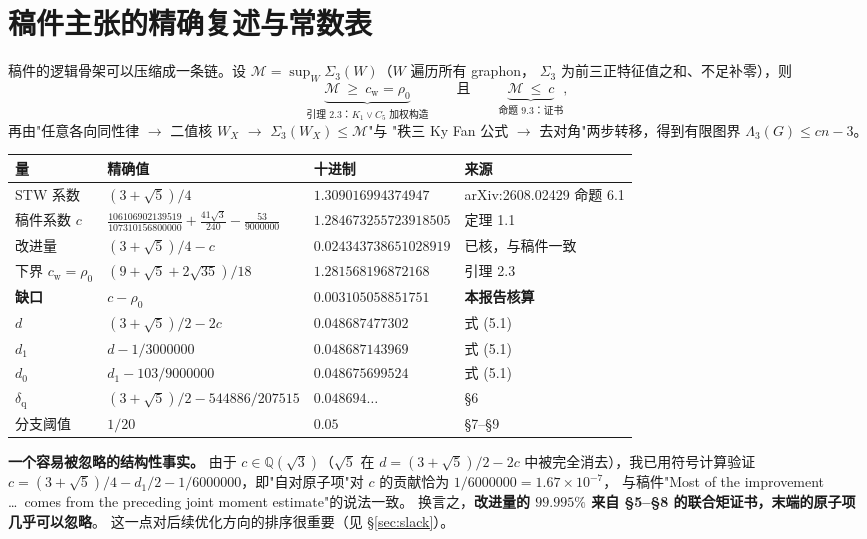 \documentclass[UTF8,11pt]{ctexart}
\theoremstyle{definition}
\newcommand{\Lam}{\Lambda}
\begin{document}
\section{稿件主张的精确复述与常数表}\label{sec:claims}

稿件的逻辑骨架可以压缩成一条链。设 $\mathcal M=\sup_W\Sigma_3(W)$（$W$ 遍历所有 graphon，
$\Sigma_3$ 为前三正特征值之和、不足补零），则
\[
 \underbrace{\mathcal M\ \ge\ c_{\mathrm w}=\rho_0}_{\text{引理 2.3：}K_1\vee C_5\text{ 加权构造}}
 \qquad\text{且}\qquad
 \underbrace{\mathcal M\ \le\ c}_{\text{命题 9.3：证书}},
\]
再由"任意各向同性律 $\to$ 二值核 $W_X$ $\to$ $\Sigma_3(W_X)\le\mathcal M$"与
"秩三 Ky Fan 公式 $\to$ 去对角"两步转移，得到有限图界 $\Lam_3(G)\le cn-3$。

\begin{center}
\small
\begin{tabular}{llll}
\toprule
量 & 精确值 & 十进制 & 来源\\
\midrule
STW 系数 & $(3+\sqrt5)/4$ & $1.309016994374947$ & \cite{STW} arXiv:2608.02429 命题 6.1\\
稿件系数 $c$ & $\frac{106106902139519}{107310156800000}+\frac{41\sqrt3}{240}-\frac{53}{9000000}$ & $1.284673255723918505$ & 定理 1.1\\
改进量 & $(3+\sqrt5)/4-c$ & $0.024343738651028919$ & 已核，与稿件一致\\
下界 $c_{\mathrm w}=\rho_0$ & $(9+\sqrt5+2\sqrt{35})/18$ & $1.281568196872168$ & 引理 2.3\\
\textbf{缺口} & $c-\rho_0$ & $\mathbf{0.003105058851751}$ & \textbf{本报告核算}\\
$d$ & $(3+\sqrt5)/2-2c$ & $0.048687477302$ & 式 (5.1)\\
$d_1$ & $d-1/3000000$ & $0.048687143969$ & 式 (5.1)\\
$d_0$ & $d_1-103/9000000$ & $0.048675699524$ & 式 (5.1)\\
$\delta_{\mathrm q}$ & $(3+\sqrt5)/2-544886/207515$ & $0.048694\ldots$ & \S6\\
分支阈值 & $1/20$ & $0.05$ & \S7--\S9\\
\bottomrule
\end{tabular}
\end{center}

\noindent\textbf{一个容易被忽略的结构性事实。} 由于 $c\in\mathbb Q(\sqrt3)$（$\sqrt5$ 在
$d=(3+\sqrt5)/2-2c$ 中被完全消去），我已用符号计算验证
$c=(3+\sqrt5)/4-d_1/2-1/6000000$，即"自对原子项"对 $c$ 的贡献恰为 $1/6000000=1.67\times10^{-7}$，
与稿件"Most of the improvement \dots\ comes from the preceding joint moment estimate"的说法一致。
换言之，\textbf{改进量的 $99.995\%$ 来自 \S5--\S8 的联合矩证书，末端的原子项几乎可以忽略}。
这一点对后续优化方向的排序很重要（见 \S\ref{sec:slack}）。
\end{document}
